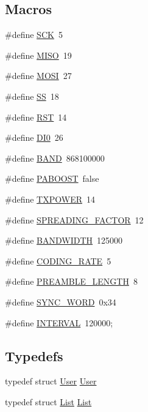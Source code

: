 \subsection*{Macros}
\begin{DoxyCompactItemize}
\item 
\#define \hyperlink{_lo_ra_ultra_team_8ino_a2dd443a4430713d325ab86895a4a45eb}{S\+CK}~5
\item 
\#define \hyperlink{_lo_ra_ultra_team_8ino_a7334c540878c8c4d801fd75ed9fd8063}{M\+I\+SO}~19
\item 
\#define \hyperlink{_lo_ra_ultra_team_8ino_a5d3f11f2fdf8a7e27b975291e0c2c8cc}{M\+O\+SI}~27
\item 
\#define \hyperlink{_lo_ra_ultra_team_8ino_a88f7782e210e61586baf33b93240d905}{SS}~18
\item 
\#define \hyperlink{_lo_ra_ultra_team_8ino_ac5d957e4fd3dc11cd97a54cf9ca057a4}{R\+ST}~14
\item 
\#define \hyperlink{_lo_ra_ultra_team_8ino_a9a608303186d0078c7108fe3142e2b73}{D\+I0}~26
\item 
\#define \hyperlink{_lo_ra_ultra_team_8ino_ab57e5c97e5d788f048284f1175c757b7}{B\+A\+ND}~868100000
\item 
\#define \hyperlink{_lo_ra_ultra_team_8ino_a48bdb6a542f988a4ad3f5a3bf8061bd5}{P\+A\+B\+O\+O\+ST}~false
\item 
\#define \hyperlink{_lo_ra_ultra_team_8ino_aa50fd7c0cc4943be023129874d201535}{T\+X\+P\+O\+W\+ER}~14
\item 
\#define \hyperlink{_lo_ra_ultra_team_8ino_adeba2e4e28e81c3c7af87e3bb9906906}{S\+P\+R\+E\+A\+D\+I\+N\+G\+\_\+\+F\+A\+C\+T\+OR}~12
\item 
\#define \hyperlink{_lo_ra_ultra_team_8ino_ab62aed7f2123c9c915242a259da9f4a8}{B\+A\+N\+D\+W\+I\+D\+TH}~125000
\item 
\#define \hyperlink{_lo_ra_ultra_team_8ino_a58b50156f9d23b8c093225d94e6f9cdd}{C\+O\+D\+I\+N\+G\+\_\+\+R\+A\+TE}~5
\item 
\#define \hyperlink{_lo_ra_ultra_team_8ino_a3e916db626fcc021393ce9c805132f90}{P\+R\+E\+A\+M\+B\+L\+E\+\_\+\+L\+E\+N\+G\+TH}~8
\item 
\#define \hyperlink{_lo_ra_ultra_team_8ino_a3e9af6b370e370158949ba1f4d064a38}{S\+Y\+N\+C\+\_\+\+W\+O\+RD}~0x34
\item 
\#define \hyperlink{_lo_ra_ultra_team_8ino_ab39fec97d85960796efedec442f38004}{I\+N\+T\+E\+R\+V\+AL}~120000;
\end{DoxyCompactItemize}
\subsection*{Typedefs}
\begin{DoxyCompactItemize}
\item 
typedef struct \hyperlink{struct_user}{User} \hyperlink{_lo_ra_ultra_team_8ino_aebb0f8a8bd00b8afba0e5abcf5b559c7}{User}
\item 
typedef struct \hyperlink{struct_list}{List} \hyperlink{_lo_ra_ultra_team_8ino_a61366e7da8638d66a464a4a6f4799199}{List}
\end{DoxyCompactItemize}

